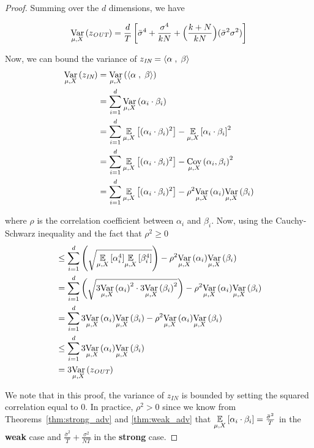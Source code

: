 \begin{proof}
Summing over the $d$ dimensions, we have 

\[
\var{\mu, X}{z_{\textit{OUT}}} = \frac{d}{T} \left[ \bar{\sigma}^4 + \frac{\sigma^4}{kN} + \Big( \frac{k+N}{kN} \Big) ( \bar{\sigma}^2\sigma^2 ) \right]
\]

Now, we can bound the variance of $z_{\textit{IN}} = \langle \alpha \; , \; \beta \rangle$
\begin{align*}
     \var{\mu, X}{z_{\textit{IN}}} &= \var{\mu, X}{\inn{\alpha}{\beta}} \\
     &= \sum_{i=1}^{d} \var{\mu, X}{\alpha_i \cdot\beta_i} \\ 
     &= \sum_{i=1}^{d} \ex{\mu, X}{(\alpha_{i} \cdot \beta_{i})^{2}} - \ex{\mu, X}{\alpha_{i} \cdot \beta_{i}}^{2} \\ 
     &= \sum_{i=1}^{d} \ex{\mu, X}{(\alpha_{i} \cdot \beta_{i})^{2}} - \cov{\mu, X}{\alpha_i , \beta_i}^{2} \\
     &= \sum_{i=1}^{d} \ex{\mu, X}{(\alpha_{i} \cdot \beta_{i})^{2}} - \rho^{2} \var{\mu, X}{\alpha_i} \var{\mu, X}{\beta_i}
\end{align*}

\noindent where $\rho$ is the correlation coefficient between $\alpha_i$ and $\beta_i$. Now, using the Cauchy-Schwarz inequality and the fact that $\rho^{2} \geq 0$
\begin{align*}
     &\leq \sum_{i=1}^{d} \left(\sqrt{ \ex{\mu, X}{\alpha_{i}^{4}} \ex{\mu, X}{\beta_{i}^{4}} } \right) - \rho^{2} \var{\mu, X}{\alpha_i} \var{\mu, X}{\beta_i} \\
     &= \sum_{i=1}^{d} \left(\sqrt{3\var{\mu, X}{\alpha_{i}}^{2} \cdot 3\var{\mu, X}{\beta_{i}}^{2}}\right) - \rho^{2} \var{\mu, X}{\alpha_i} \var{\mu, X}{\beta_i} \\
     &= \sum_{i=1}^{d} 3\var{\mu, X}{\alpha_{i}} \var{\mu, X}{\beta_{i}} - \rho^{2} \var{\mu, X}{\alpha_i} \var{\mu, X}{\beta_i} \\
     &\leq \sum_{i=1}^{d} 3\var{\mu, X}{\alpha_{i}} \var{\mu, X}{\beta_{i}} \\
     &= 3\var{\mu, X}{z_{\textit{OUT}}}
\end{align*}

\newcommand{\indep}[0]{\perp\!\!\!\perp}
\newcommand{\alphaind}[0]{\alpha_{i,\indep}}
\newcommand{\alphatau}[0]{\alpha_{i,\tau}}
\newcommand{\alphatausplit}[1]{\alpha_{i,\tau,\textbf{#1}}}

We note that in this proof, the variance of $z_{\textit{IN}}$ is bounded by setting the squared correlation equal to 0. In practice, $\rho^{2} > 0$ since we know from Theorems~\ref{thm:strong_adv}  and \ref{thm:weak_adv} that $\ex{\mu,X}{\alpha_i \cdot \beta_i} =  \frac{\bar{\sigma}^2}{T}$ in the \textbf{weak} case and $\frac{\bar{\sigma}^2}{T} + \frac{\sigma^2}{NT}$ in the \textbf{strong} case.


\end{proof}
